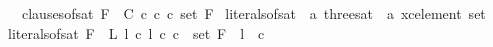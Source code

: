 {\ \ {\isachardoublequoteopen}clauses{\isacharunderscore}{\kern0pt}of{\isacharunderscore}{\kern0pt}sat\ F\ {\isacharequal}{\kern0pt}\ {\isacharbraceleft}{\kern0pt}C\ c{\isacharbar}{\kern0pt}\ c{\isachardot}{\kern0pt}\ c{\isasymin}\ set\ F{\isacharbraceright}{\kern0pt}{\isachardoublequoteclose}\isanewline
\isanewline
{}\isamarkupfalse%
\ literals{\isacharunderscore}{\kern0pt}of{\isacharunderscore}{\kern0pt}sat\ {\isacharcolon}{\kern0pt}{\isacharcolon}{\kern0pt}\ {\isachardoublequoteopen}{\isacharprime}{\kern0pt}a\ three{\isacharunderscore}{\kern0pt}sat\ {\isasymRightarrow}\ {\isacharprime}{\kern0pt}a\ xc{\isacharunderscore}{\kern0pt}element\ set{\isachardoublequoteclose}\ \isanewline
{\isachardoublequoteopen}literals{\isacharunderscore}{\kern0pt}of{\isacharunderscore}{\kern0pt}sat\ F\ {\isacharequal}{\kern0pt}\ {\isacharbraceleft}{\kern0pt}L\ l\ c{\isacharbar}{\kern0pt}\ l\ c{\isachardot}{\kern0pt}\ c\ {\isasymin}\ set\ F\ {\isasymand}\ l\ {\isasymin}\ c{\isacharbraceright}{\kern0pt}{\isachardoublequoteclose}
}

